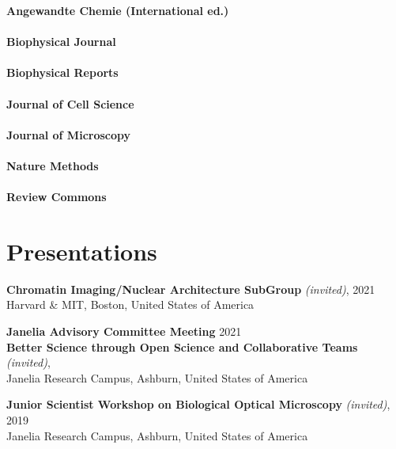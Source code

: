 \documentclass[margin,line]{res}
\begin{document}
\begin{resume}
{\bf   Angewandte Chemie (International ed.)} \\
\vspace*{-3mm}\\
{\bf   Biophysical Journal}\\
\vspace*{-3mm}\\
{\bf   Biophysical Reports}\\
\vspace*{-3mm}\\
{\bf   Journal of Cell Science}\\
\vspace*{-3mm}\\
{\bf  Journal of Microscopy}\\
\vspace*{-3mm}\\
{\bf    Nature Methods}\\
\vspace*{-3mm}\\
{\bf    Review Commons}\\


\section{\sc  Presentations}

{\bf  Chromatin Imaging/Nuclear Architecture SubGroup}  {\it (invited)}, \hfill 2021\\
Harvard \& MIT, Boston, United States of America %

\vspace*{-2.5mm}
{\bf  Janelia Advisory Committee Meeting}  \hfill 2021\\
{\bf Better Science through Open Science and Collaborative Teams}  {\it (invited)}, \\
Janelia Research Campus, Ashburn, United States of America %

\vspace*{-2.5mm}
{\bf  Junior Scientist Workshop on Biological Optical Microscopy} {\it (invited)},  \hfill 2019\\
Janelia Research Campus, Ashburn, United States of America %


\end{resume}
\end{document}
